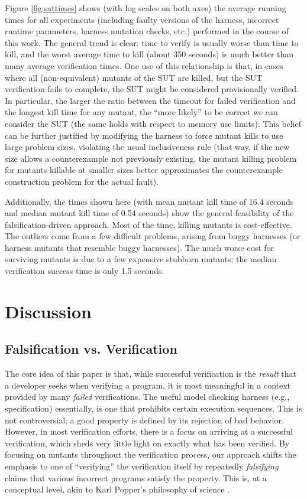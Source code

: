 \documentclass[conference]{IEEEtran}
\begin{document}
Figure \ref{fig:sattimes} shows (with log scales on both axes) the
average running times for all experiments (including faulty versions
of the harness, incorrect runtime parameters, harness mutation checks,
etc.) performed in the course of this work.  The general trend is
clear: time to verify is usually worse than time to kill, and the
worst average time to kill (about 350 seconds) is much better than
many average verification times.  One use of this relationship is
that, in cases where all (non-equivalent) mutants of the SUT are
killed, but the SUT verification fails to complete, the SUT might be
considered provisionally verified. In particular, the larger
the ratio between the timeout for failed verification and the longest
kill time for any mutant, the ``more likely'' to be correct we can
consider the SUT (the same holds with respect to memory use
limits). This belief can be further justified by modifying the harness
to force mutant kills to use large problem sizes, violating the usual
inclusiveness rule (that way, if the new size allows a counterexample
not previously existing, the mutant killing problem for mutants
killable at smaller sizes better approximates the counterexample
construction problem for the actual fault).

Additionally, the times shown here (with mean mutant kill time of 16.4
seconds and median mutant kill time of 0.54 seconds) show the general
feasibility of the falsification-driven approach.  Most of the time,
killing mutants is cost-effective.  The outliers come from a few
difficult problems, arising from buggy harnesses (or harness mutants
that resemble buggy harnesses).  The much worse cost for surviving
mutants is due to a few expensive stubborn mutants: the median
verification success time is only 1.5 seconds.

\section{Discussion}

\subsection{Falsification vs. Verification}

The core idea of this paper is that, while successful verification is
the \emph{result} that a developer seeks when verifying a program, it
is most meaningful in a context provided by many \emph{failed} verifications.
The useful model checking harness (e.g., specification) essentially,
is one that prohibits certain execution sequences.  This is not
controversial; a good property is defined by its rejection of bad
behavior.  However, in most verification efforts, there is a focus on
arriving at a successful verification, which sheds very little light
on exactly what has been verified.  By focusing on mutants throughout the
verification process, our approach shifts the emphasis to one of
``verifying'' the verification itself by repeatedly \emph{falsifying}
claims that various incorrect programs satisfy the property.  This is,
at a conceptual level, akin to Karl Popper's philosophy of science
\cite{Popper}.
\end{document}
